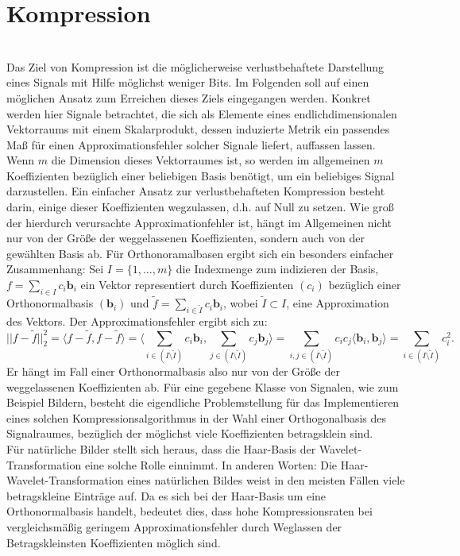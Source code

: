 \section{Kompression}~\\
Das Ziel von Kompression ist die möglicherweise verlustbehaftete Darstellung eines Signals mit Hilfe möglichst weniger Bits. Im Folgenden soll auf einen möglichen Ansatz zum Erreichen dieses Ziels eingegangen werden.
Konkret werden hier Signale betrachtet, die sich als Elemente eines endlichdimensionalen Vektorraums mit einem Skalarprodukt, dessen induzierte Metrik ein passendes Maß für einen Approximationsfehler solcher Signale liefert, auffassen lassen. Wenn $m$ die Dimension dieses Vektorraumes ist, so werden im allgemeinen $m$ Koeffizienten bezüglich einer beliebigen Basis benötigt, um ein beliebiges Signal darzustellen. Ein einfacher Ansatz zur verlustbehafteten Kompression besteht darin, einige dieser Koeffizienten wegzulassen, d.h. auf Null zu setzen. Wie groß der hierdurch verursachte Approximationfehler ist, hängt im Allgemeinen nicht nur von der Größe der weggelassenen Koeffizienten, sondern auch von der gewählten Basis ab. Für Orthonoramalbasen ergibt sich ein besonders einfacher Zusammenhang: Sei $I=\{1,...,m\}$ die Indexmenge zum indizieren der Basis, $f=\sum_{i \in I} c_i \mathbf{b}_i$ ein Vektor representiert durch Koeffizienten $(c_i)$ bezüglich einer Orthonormalbasis $(\mathbf{b}_i)$ und $\tilde{f}=\sum_{i \in \tilde{I}} c_i \mathbf{b}_i$, wobei $\tilde{I} \subset I$, eine Approximation des Vektors. Der Approximationsfehler ergibt sich zu:
%
\[
||f-\tilde{f}||_2^2 
= \langle f-\tilde{f}, f-\tilde{f} \rangle 
= \langle \sum_{i \in (I \setminus \tilde{I})} c_i \mathbf{b}_i , \sum_{j \in (I \setminus \tilde{I})} c_j \mathbf{b}_j \rangle 
= \sum_{i,j \in (I \setminus \tilde{I})} c_i c_j \langle \mathbf{b}_i , \mathbf{b}_j \rangle 
= \sum_{i \in (I \setminus \tilde{I})} c_i^2
.
\]
%
Er hängt im Fall einer Orthonormalbasis also nur von der Größe der weggelassenen Koeffizienten ab. Für eine gegebene Klasse von Signalen, wie zum Beispiel Bildern, besteht die eigendliche Problemstellung für das Implementieren eines solchen Kompressionsalgorithmus in der Wahl einer Orthogonalbasis des Signalraumes, bezüglich der möglichst viele Koeffizienten betragsklein sind.\\
Für natürliche Bilder stellt sich heraus, dass die Haar-Basis der Wavelet-Transformation eine solche Rolle einnimmt. In anderen Worten: Die Haar-Wavelet-Transformation eines natürlichen Bildes weist in den meisten Fällen viele betragskleine Einträge auf. Da es sich bei der Haar-Basis um eine Orthonormalbasis handelt, bedeutet dies, dass hohe Kompressionsraten bei vergleichsmäßig geringem Approximationsfehler durch Weglassen der Betragskleinsten Koeffizienten möglich sind. \\
